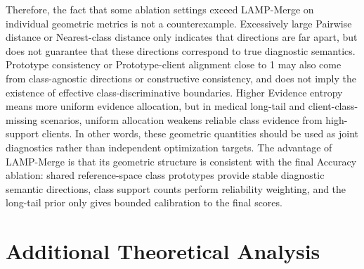 \documentclass[letterpaper]{article}
\begin{document}
Therefore, the fact that some ablation settings exceed LAMP-Merge on individual geometric metrics is not a counterexample. Excessively large Pairwise distance or Nearest-class distance only indicates that directions are far apart, but does not guarantee that these directions correspond to true diagnostic semantics. Prototype consistency or Prototype-client alignment close to 1 may also come from class-agnostic directions or constructive consistency, and does not imply the existence of effective class-discriminative boundaries. Higher Evidence entropy means more uniform evidence allocation, but in medical long-tail and client-class-missing scenarios, uniform allocation weakens reliable class evidence from high-support clients. In other words, these geometric quantities should be used as joint diagnostics rather than independent optimization targets. The advantage of LAMP-Merge is that its geometric structure is consistent with the final Accuracy ablation: shared reference-space class prototypes provide stable diagnostic semantic directions, class support counts perform reliability weighting, and the long-tail prior only gives bounded calibration to the final scores.


\section{Additional Theoretical Analysis}
\end{document}
